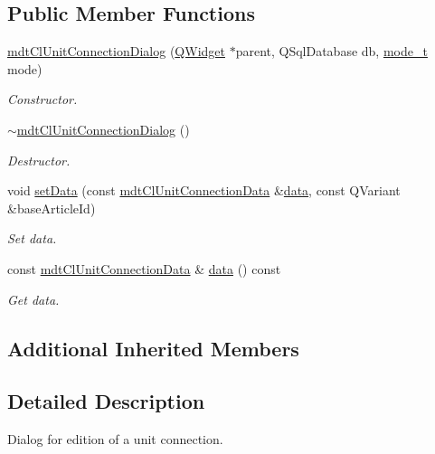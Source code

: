 \subsection*{Public Member Functions}
\begin{DoxyCompactItemize}
\item 
\hyperlink{classmdt_cl_unit_connection_dialog_adf4b609e4ba336afd698f5d40744756c}{mdt\-Cl\-Unit\-Connection\-Dialog} (\hyperlink{class_q_widget}{Q\-Widget} $\ast$parent, Q\-Sql\-Database db, \hyperlink{classmdt_cl_unit_connection_dialog_a754889f1591eddb79b69de4c51532f43}{mode\-\_\-t} mode)
\begin{DoxyCompactList}\small\item\em Constructor. \end{DoxyCompactList}\item 
\hyperlink{classmdt_cl_unit_connection_dialog_a13e97c80ada11457bbf7b1c4173a09b1}{$\sim$mdt\-Cl\-Unit\-Connection\-Dialog} ()
\begin{DoxyCompactList}\small\item\em Destructor. \end{DoxyCompactList}\item 
void \hyperlink{classmdt_cl_unit_connection_dialog_a1692e64b3b636cd1e10df1da0ae7fdf5}{set\-Data} (const \hyperlink{classmdt_cl_unit_connection_data}{mdt\-Cl\-Unit\-Connection\-Data} \&\hyperlink{classmdt_cl_unit_connection_dialog_a32ab19b0b29e1d7b188518d26d6dd72e}{data}, const Q\-Variant \&base\-Article\-Id)
\begin{DoxyCompactList}\small\item\em Set data. \end{DoxyCompactList}\item 
const \hyperlink{classmdt_cl_unit_connection_data}{mdt\-Cl\-Unit\-Connection\-Data} \& \hyperlink{classmdt_cl_unit_connection_dialog_a32ab19b0b29e1d7b188518d26d6dd72e}{data} () const 
\begin{DoxyCompactList}\small\item\em Get data. \end{DoxyCompactList}\end{DoxyCompactItemize}
\subsection*{Additional Inherited Members}


\subsection{Detailed Description}
Dialog for edition of a unit connection. 

